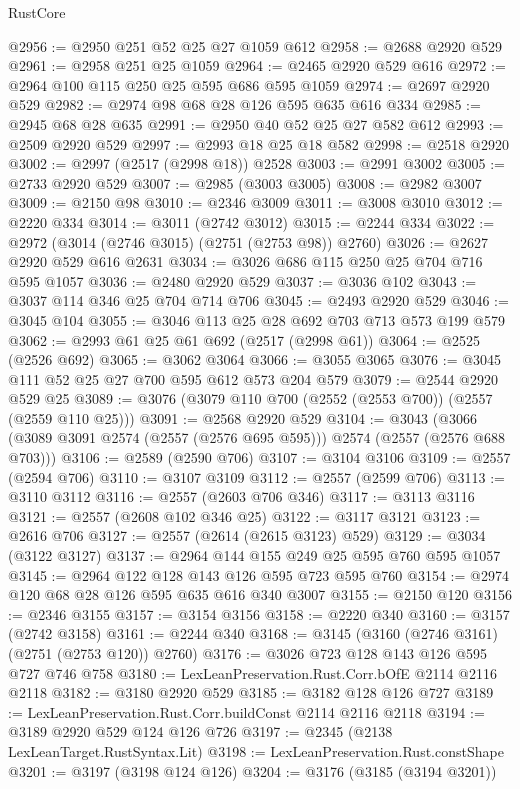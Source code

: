 \begin{lexlean}{RustCore}
\begin{coremodule}
@2956 := @2950 @251 @52 @25 @27 @1059 @612
@2958 := @2688 @2920 @529
@2961 := @2958 @251 @25 @1059
@2964 := @2465 @2920 @529 @616
@2972 := @2964 @100 @115 @250 @25 @595 @686 @595 @1059
@2974 := @2697 @2920 @529
@2982 := @2974 @98 @68 @28 @126 @595 @635 @616 @334
@2985 := @2945 @68 @28 @635
@2991 := @2950 @40 @52 @25 @27 @582 @612
@2993 := @2509 @2920 @529
@2997 := @2993 @18 @25 @18 @582
@2998 := @2518 @2920
@3002 := @2997 (@2517 (@2998 @18)) @2528
@3003 := @2991 @3002
@3005 := @2733 @2920 @529
@3007 := @2985 (@3003 @3005)
@3008 := @2982 @3007
@3009 := @2150 @98
@3010 := @2346 @3009
@3011 := @3008 @3010
@3012 := @2220 @334
@3014 := @3011 (@2742 @3012)
@3015 := @2244 @334
@3022 := @2972 (@3014 (@2746 @3015) (@2751 (@2753 @98)) @2760)
@3026 := @2627 @2920 @529 @616 @2631
@3034 := @3026 @686 @115 @250 @25 @704 @716 @595 @1057
@3036 := @2480 @2920 @529
@3037 := @3036 @102
@3043 := @3037 @114 @346 @25 @704 @714 @706
@3045 := @2493 @2920 @529
@3046 := @3045 @104
@3055 := @3046 @113 @25 @28 @692 @703 @713 @573 @199 @579
@3062 := @2993 @61 @25 @61 @692 (@2517 (@2998 @61))
@3064 := @2525 (@2526 @692)
@3065 := @3062 @3064
@3066 := @3055 @3065
@3076 := @3045 @111 @52 @25 @27 @700 @595 @612 @573 @204 @579
@3079 := @2544 @2920 @529 @25
@3089 := @3076 (@3079 @110 @700 (@2552 (@2553 @700)) (@2557 (@2559 @110 @25)))
@3091 := @2568 @2920 @529
@3104 := @3043 (@3066 (@3089 @3091 @2574 (@2557 (@2576 @695 @595))) @2574 (@2557 (@2576 @688 @703)))
@3106 := @2589 (@2590 @706)
@3107 := @3104 @3106
@3109 := @2557 (@2594 @706)
@3110 := @3107 @3109
@3112 := @2557 (@2599 @706)
@3113 := @3110 @3112
@3116 := @2557 (@2603 @706 @346)
@3117 := @3113 @3116
@3121 := @2557 (@2608 @102 @346 @25)
@3122 := @3117 @3121
@3123 := @2616 @706
@3127 := @2557 (@2614 (@2615 @3123) @529)
@3129 := @3034 (@3122 @3127)
@3137 := @2964 @144 @155 @249 @25 @595 @760 @595 @1057
@3145 := @2964 @122 @128 @143 @126 @595 @723 @595 @760
@3154 := @2974 @120 @68 @28 @126 @595 @635 @616 @340 @3007
@3155 := @2150 @120
@3156 := @2346 @3155
@3157 := @3154 @3156
@3158 := @2220 @340
@3160 := @3157 (@2742 @3158)
@3161 := @2244 @340
@3168 := @3145 (@3160 (@2746 @3161) (@2751 (@2753 @120)) @2760)
@3176 := @3026 @723 @128 @143 @126 @595 @727 @746 @758
@3180 := LexLeanPreservation.Rust.Corr.bOfE @2114 @2116 @2118
@3182 := @3180 @2920 @529
@3185 := @3182 @128 @126 @727
@3189 := LexLeanPreservation.Rust.Corr.buildConst @2114 @2116 @2118
@3194 := @3189 @2920 @529 @124 @126 @726
@3197 := @2345 (@2138 LexLeanTarget.RustSyntax.Lit)
@3198 := LexLeanPreservation.Rust.constShape
@3201 := @3197 (@3198 @124 @126)
@3204 := @3176 (@3185 (@3194 @3201))

\end{coremodule}
\end{lexlean}
